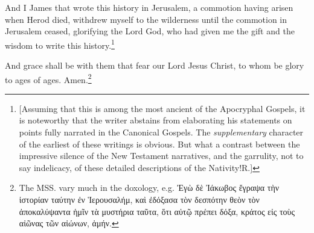 \pend\pstart
{}

\pend\pstart
And I James that wrote this history in Jerusalem, a commotion having arisen when Herod died, withdrew myself to the wilderness until the commotion in Jerusalem ceased, glorifying the Lord God, who had given me the gift and the wisdom to write this history.\footnote{[Assuming that this is among the most ancient of the Apocryphal Gospels, it is noteworthy that the writer abstains from elaborating his statements on points fully narrated in the Canonical Gospels. The \textit{supplementary} character of the earliest of these writings is obvious. But what a contrast between the impressive silence of the New Testament narratives, and the garrulity, not to say indelicacy, of these detailed descriptions of the Nativity!\textemdash R.]}

\pend\pstart
And grace shall be with them that fear our Lord Jesus Christ, to whom be glory to ages of ages. Amen.\footnote{The MSS. vary much in the doxology, e.g. {\greekfont Ἐγὼ δὲ Ἰάκωβος ἔγραψα τὴν ἱστορίαν ταύτην ἐν Ἱερουσαλήμ, καὶ ἐδόξασα τὸν δεσπότην θεὸν τὸν ἀποκαλύψαντα ἡμῖν τὰ μυστήρια ταῦτα, ὅτι αὐτῷ πρέπει δόξα, κράτος εἰς τοὺς αἰῶνας τῶν αἰώνων, ἀμήν.}}

\pend
